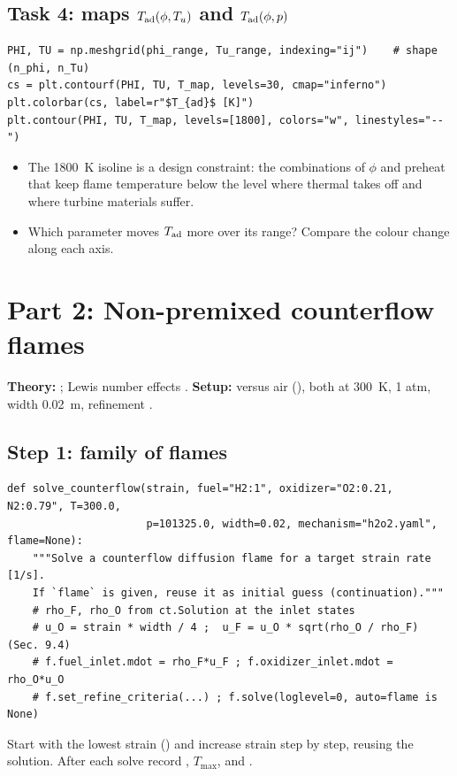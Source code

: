 \subsection*{Task 4: maps $T_{\mathrm{ad}}(\phi,T_u)$ and $T_{\mathrm{ad}}(\phi,p)$}
\begin{lstlisting}
PHI, TU = np.meshgrid(phi_range, Tu_range, indexing="ij")    # shape (n_phi, n_Tu)
cs = plt.contourf(PHI, TU, T_map, levels=30, cmap="inferno")
plt.colorbar(cs, label=r"$T_{ad}$ [K]")
plt.contour(PHI, TU, T_map, levels=[1800], colors="w", linestyles="--")
\end{lstlisting}
\begin{itemize}
  \item The \SI{1800}{\kelvin} isoline is a design constraint: the combinations of $\phi$ and preheat that keep
        flame temperature below the level where thermal  takes off and where turbine materials suffer.
  \item Which parameter moves $T_{\mathrm{ad}}$ more over its range? Compare the colour change along each axis.
\end{itemize}

\section{Part 2: Non-premixed counterflow flames}

\textbf{Theory:} ; Lewis number effects . \textbf{Setup:}  versus air
(), both at \SI{300}{\kelvin}, 1 atm, width \SI{0.02}{\metre}, refinement
.

\subsection*{Step 1: family of flames}
\begin{lstlisting}
def solve_counterflow(strain, fuel="H2:1", oxidizer="O2:0.21, N2:0.79", T=300.0,
                      p=101325.0, width=0.02, mechanism="h2o2.yaml", flame=None):
    """Solve a counterflow diffusion flame for a target strain rate [1/s].
    If `flame` is given, reuse it as initial guess (continuation)."""
    # rho_F, rho_O from ct.Solution at the inlet states
    # u_O = strain * width / 4 ;  u_F = u_O * sqrt(rho_O / rho_F)      (Sec. 9.4)
    # f.fuel_inlet.mdot = rho_F*u_F ; f.oxidizer_inlet.mdot = rho_O*u_O
    # f.set_refine_criteria(...) ; f.solve(loglevel=0, auto=flame is None)
\end{lstlisting}
Start with the lowest strain () and increase strain step by step, reusing the
solution. After each solve record , $T_{\max}$, and .

